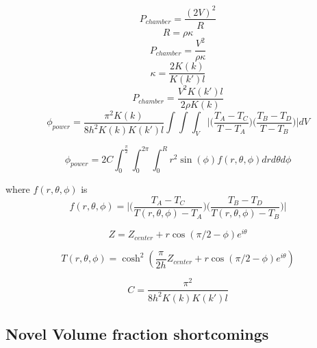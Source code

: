 \begin{equation}
    P_{chamber} = \frac{(2V)^2}{R}
\end{equation}
\begin{equation}
    R = \rho\kappa
\end{equation}
\begin{equation}
    P_{chamber} = \frac{V^2}{\rho\kappa}
\end{equation}
\begin{equation}
    \kappa = \frac{2K(k)}{K(k')l}
\end{equation}
\begin{equation}
    P_{chamber} = \frac{V^2K(k')l}{2\rho K(k)}
\end{equation}
\begin{equation}
    \phi_{power} = \frac{\pi^2 K(k)}{8h^2K(k)K(k')l} \int\int\int_V \Bigg|\Big(\frac{T_A-T_C}{T-T_A}\Big)\Big(\frac{T_B-T_D}{T-T_B}\Big)\Bigg| dV
\end{equation}

\begin{equation}
    \phi_{power} = 2C\int^\frac{\pi}{2}_0\int^{2\pi}_0\int^R_0 r^2 \sin(\phi) f(r,\theta,\phi) drd\theta d\phi
\end{equation}

where $f(r,\theta,\phi)$ is
\begin{equation}
    f(r,\theta,\phi) = \bigg|\Big(\frac{T_A-T_C}{T(r,\theta,\phi)-T_A}\Big)\Big(\frac{T_B-T_D}{T(r,\theta,\phi)-T_B}\Big)\bigg|
\end{equation}

\begin{equation}
    Z = Z_{center} + r\cos(\pi/2-\phi)e^{i\theta}
\end{equation}

\begin{equation}
    T(r,\theta,\phi) = \cosh^2(\frac{\pi}{2h}Z_{center} + r\cos(\pi/2-\phi)e^{i\theta})
\end{equation}


\begin{equation}
    C = \frac{\pi^2}{8h^2K(k)K(k')l}
\end{equation}

\subsection*{Novel Volume fraction shortcomings}


